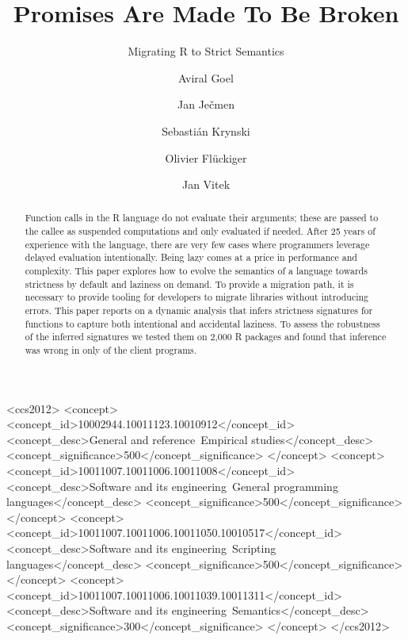 \documentclass[review,creen,acmsmall]{acmart}
\begin{document}
\title{Promises Are Made To Be Broken}
\subtitle{Migrating R to Strict
  Semantics}

\author{Aviral Goel}
\author{Jan Ječmen}
\author{Sebastián Krynski}
\author{Olivier Flückiger}
\author{Jan Vitek}
\authorsaddresses{}
\renewcommand{\shortauthors}{Goel, et al.}

\begin{abstract}
  Function calls in the R language do not evaluate their arguments; these are
  passed to the callee as suspended computations and only evaluated if needed.
  After 25 years of experience with the language, there are very few cases where
  programmers leverage delayed evaluation intentionally. Being lazy comes at a
  price in performance and complexity. This paper explores how to evolve the
  semantics of a language towards strictness by default and laziness on demand.
  To provide a migration path, it is necessary to provide tooling for developers
  to migrate libraries without introducing errors. This paper reports on a
  dynamic analysis that infers strictness signatures for functions to capture
  both intentional and accidental laziness. To assess the robustness of the
  inferred signatures we tested them on 2,000 R packages and found that
  inference was wrong in only \robustnesResult of the client programs.
\end{abstract}

\begin{CCSXML}
<ccs2012>
<concept>
<concept_id>10002944.10011123.10010912</concept_id>
<concept_desc>General and reference~Empirical studies</concept_desc>
<concept_significance>500</concept_significance>
</concept>
<concept>
<concept_id>10011007.10011006.10011008</concept_id>
<concept_desc>Software and its engineering~General programming languages</concept_desc>
<concept_significance>500</concept_significance>
</concept>
<concept>
<concept_id>10011007.10011006.10011050.10010517</concept_id>
<concept_desc>Software and its engineering~Scripting languages</concept_desc>
<concept_significance>500</concept_significance>
</concept>
<concept>
<concept_id>10011007.10011006.10011039.10011311</concept_id>
<concept_desc>Software and its engineering~Semantics</concept_desc>
<concept_significance>300</concept_significance>
</concept>
</ccs2012>
\end{CCSXML}
\end{document}
